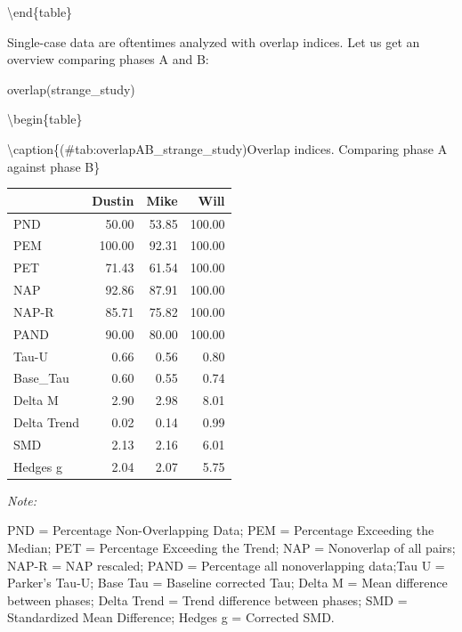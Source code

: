 \documentclass[
]{book}
\newenvironment{Shaded}{\begin{snugshade}}{\end{snugshade}}
\newcommand{\FunctionTok}[1]{\textcolor[rgb]{0.00,0.00,0.00}{#1}}
\newcommand{\NormalTok}[1]{#1}
\begin{document}
\textbackslash end\{table\}

Single-case data are oftentimes analyzed with overlap indices. Let us get an overview comparing phases A and B:

\begin{Shaded}
\begin{Highlighting}[]
\FunctionTok{overlap}\NormalTok{(strange\_study)}
\end{Highlighting}
\end{Shaded}

\textbackslash begin\{table\}

\textbackslash caption\{(\#tab:overlapAB\_strange\_study)Overlap indices. Comparing phase A against phase B\}
\centering

\begin{threeparttable}
\begin{tabular}[t]{lrrr}
\toprule
  & Dustin & Mike & Will\\
\midrule
PND & 50.00 & 53.85 & 100.00\\
PEM & 100.00 & 92.31 & 100.00\\
PET & 71.43 & 61.54 & 100.00\\
NAP & 92.86 & 87.91 & 100.00\\
NAP-R & 85.71 & 75.82 & 100.00\\
PAND & 90.00 & 80.00 & 100.00\\
Tau-U & 0.66 & 0.56 & 0.80\\
Base\_Tau & 0.60 & 0.55 & 0.74\\
Delta M & 2.90 & 2.98 & 8.01\\
Delta Trend & 0.02 & 0.14 & 0.99\\
SMD & 2.13 & 2.16 & 6.01\\
Hedges g & 2.04 & 2.07 & 5.75\\
\bottomrule
\end{tabular}
\begin{tablenotes}
\item \textit{Note: } 
\item PND = Percentage Non-Overlapping Data; PEM = Percentage Exceeding the Median; PET = Percentage Exceeding the Trend; NAP = Nonoverlap of all pairs; NAP-R = NAP rescaled; PAND = Percentage all nonoverlapping data;Tau U = Parker's Tau-U; Base Tau = Baseline corrected Tau; Delta M = Mean difference between phases; Delta Trend = Trend difference between phases; SMD = Standardized Mean Difference; Hedges g = Corrected SMD.
\end{tablenotes}
\end{threeparttable}
\end{document}
